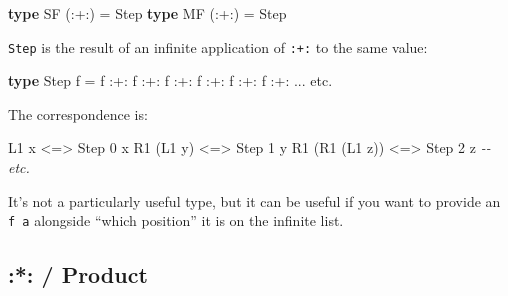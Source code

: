 \documentclass[]{article}
\newenvironment{Shaded}{}{}
\newcommand{\CommentTok}[1]{\textcolor[rgb]{0.38,0.63,0.69}{\textit{#1}}}
\newcommand{\DataTypeTok}[1]{\textcolor[rgb]{0.56,0.13,0.00}{#1}}
\newcommand{\DecValTok}[1]{\textcolor[rgb]{0.25,0.63,0.44}{#1}}
\newcommand{\KeywordTok}[1]{\textcolor[rgb]{0.00,0.44,0.13}{\textbf{#1}}}
\newcommand{\NormalTok}[1]{#1}
\newcommand{\OperatorTok}[1]{\textcolor[rgb]{0.40,0.40,0.40}{#1}}
\newcommand{\OtherTok}[1]{\textcolor[rgb]{0.00,0.44,0.13}{#1}}
\begin{document}
\begin{itemize}
\begin{Shaded}
\begin{Highlighting}[]
\KeywordTok{type} \DataTypeTok{SF}\NormalTok{ (}\OperatorTok{:+:}\NormalTok{) }\OtherTok{=} \DataTypeTok{Step}
\KeywordTok{type} \DataTypeTok{MF}\NormalTok{ (}\OperatorTok{:+:}\NormalTok{) }\OtherTok{=} \DataTypeTok{Step}
\end{Highlighting}
\end{Shaded}

  \texttt{Step} is the result of an infinite application of \texttt{:+:} to the
  same value:

\begin{Shaded}
\begin{Highlighting}[]
\KeywordTok{type} \DataTypeTok{Step}\NormalTok{ f }\OtherTok{=}\NormalTok{ f }\OperatorTok{:+:}\NormalTok{ f }\OperatorTok{:+:}\NormalTok{ f }\OperatorTok{:+:}\NormalTok{ f }\OperatorTok{:+:}\NormalTok{ f }\OperatorTok{:+:}\NormalTok{ f }\OperatorTok{:+:} \OperatorTok{...}\NormalTok{ etc}\OperatorTok{.}
\end{Highlighting}
\end{Shaded}

  The correspondence is:

\begin{Shaded}
\begin{Highlighting}[]
\DataTypeTok{L1}\NormalTok{ x           }\OperatorTok{<=>} \DataTypeTok{Step} \DecValTok{0}\NormalTok{ x}
\DataTypeTok{R1}\NormalTok{ (}\DataTypeTok{L1}\NormalTok{ y)      }\OperatorTok{<=>} \DataTypeTok{Step} \DecValTok{1}\NormalTok{ y}
\DataTypeTok{R1}\NormalTok{ (}\DataTypeTok{R1}\NormalTok{ (}\DataTypeTok{L1}\NormalTok{ z)) }\OperatorTok{<=>} \DataTypeTok{Step} \DecValTok{2}\NormalTok{ z}
\CommentTok{{-}{-} etc.}
\end{Highlighting}
\end{Shaded}

  It's not a particularly useful type, but it can be useful if you want to
  provide an \texttt{f\ a} alongside ``which position'' it is on the infinite
  list.
\end{itemize}

\hypertarget{product}{%
\subsection{:*: / Product}\label{product}}
\end{document}
